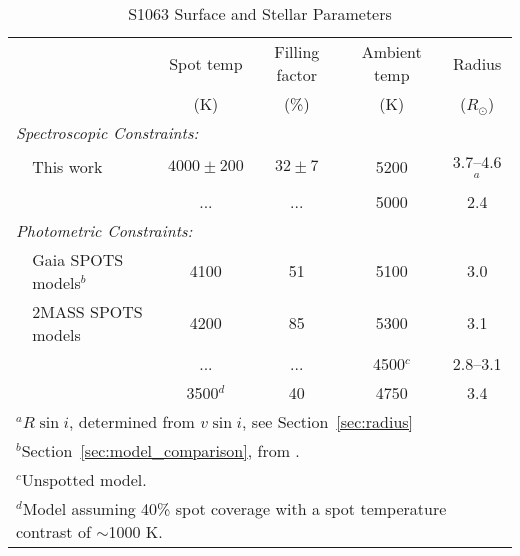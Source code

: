 \documentclass[twocolumn,tighten]{aastex631}
\begin{document}
\begin{table*}[]
\label{tab:s1063parameters}
\caption{S1063 Surface and Stellar Parameters}
\begin{tabular}{llcccc}

  &         & Spot temp  & Filling factor & Ambient temp & Radius  \\
   &        &  (K) & (\%) &  (K) & ($R_{\odot}$) \\ \hline
\multicolumn{3}{l}{\textit{Spectroscopic Constraints:}}  \\
\phantom{EEE} & This work     & $4000\pm200$  & $32\pm7$    & 5200 &   3.7--4.6$^{a}$     \\
& \citet{mathieu03} &  ...    &  ...    &     5000    &  2.4  \\
\multicolumn{3}{l}{\textit{Photometric Constraints:}} \\
& Gaia SPOTS models$^{b}$  &   4100   &  51  &   5100  &   3.0  \\  
& 2MASS SPOTS models &   4200   & 85    &   5300  &    3.1    \\
& \citet{leiner17} & ... & ... & 4500$^{c}$ & 2.8--3.1 \\
& & 3500$^{d}$ & 40 & 4750 & 3.4 \\
\hline
\multicolumn{6}{l}{$^{a}$$R \sin i$, determined from $v\sin i$, see Section~\ref{sec:radius}} \\
\multicolumn{6}{l}{$^{b}$Section~\ref{sec:model_comparison}, from \citet{somers20}.} \\
\multicolumn{6}{l}{$^{c}$Unspotted model.} \\
\multicolumn{6}{l}{$^{d}$Model assuming 40\% spot coverage with a spot temperature contrast of $\sim$1000 K.}
\end{tabular}
\end{table*}
\end{document}
